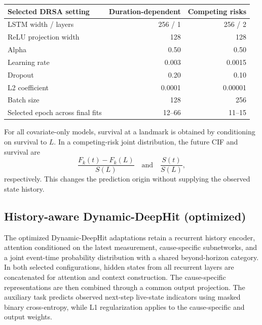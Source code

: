 \begin{center}\begin{minipage}{\textwidth}\centering\small
\begin{tabular}{lrr}\toprule
Selected DRSA setting & Duration-dependent & Competing risks\\\midrule
LSTM width / layers & 256 / 1 & 256 / 2\\
ReLU projection width & 128 & 128\\
Alpha & 0.50 & 0.50\\
Learning rate & 0.003 & 0.0015\\
Dropout & 0.20 & 0.10\\
L2 coefficient & 0.0001 & 0.00001\\
Batch size & 128 & 256\\
Selected epoch across final fits & 12--66 & 11--15\\\bottomrule
\end{tabular}
\end{minipage}\end{center}

For all covariate-only models, survival at a landmark is obtained by conditioning on survival to $L$. In a competing-risk joint distribution, the future CIF and survival are
\[
\frac{F_k(t)-F_k(L)}{S(L)}\quad\text{and}\quad\frac{S(t)}{S(L)},
\]
respectively. This changes the prediction origin without supplying the observed state history.

\subsection{History-aware Dynamic-DeepHit (optimized)}
The optimized Dynamic-DeepHit adaptations retain a recurrent history encoder, attention conditioned on the latest measurement, cause-specific subnetworks, and a joint event-time probability distribution with a shared beyond-horizon category. In both selected configurations, hidden states from all recurrent layers are concatenated for attention and context construction. The cause-specific representations are then combined through a common output projection. The auxiliary task predicts observed next-step live-state indicators using masked binary cross-entropy, while L1 regularization applies to the cause-specific and output weights.

